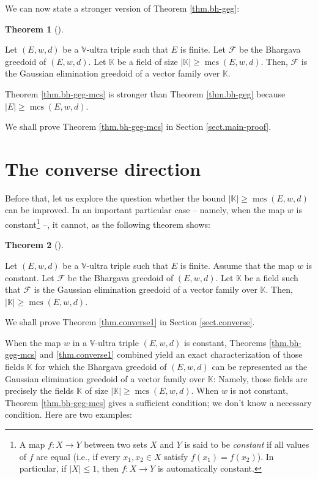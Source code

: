 \documentclass[numbers=enddot,12pt,final,onecolumn,notitlepage]{scrartcl}%
\theoremstyle{definition}
\newtheorem{theo}{Theorem}[section]
\newenvironment{theorem}[1][]
{\begin{theo}[#1]\begin{leftbar}}
{\end{leftbar}\end{theo}}
\renewcommand{\leq}{\leqslant}
\renewcommand{\geq}{\geqslant}
\theoremstyle{plainsl}
\begin{document}
We can now state a stronger version of Theorem \ref{thm.bh-geg}:

\begin{theorem}
\label{thm.bh-geg-mcs}Let $\left(  E,w,d\right)  $ be a $\mathbb{V}$-ultra
triple such that $E$ is finite. Let $\mathcal{F}$ be the Bhargava greedoid of
$\left(  E,w,d\right)  $. Let $\mathbb{K}$ be a field of size $\left\vert
\mathbb{K}\right\vert \geq\operatorname*{mcs}\left(  E,w,d\right)  $. Then,
$\mathcal{F}$ is the Gaussian elimination greedoid of a vector family over
$\mathbb{K}$.
\end{theorem}

Theorem \ref{thm.bh-geg-mcs} is stronger than Theorem \ref{thm.bh-geg} because
$\left\vert E\right\vert \geq\operatorname*{mcs}\left(  E,w,d\right)  $.

We shall prove Theorem \ref{thm.bh-geg-mcs} in Section \ref{sect.main-proof}.

\section{The converse direction}

Before that, let us explore the question whether the bound $\left\vert
\mathbb{K}\right\vert \geq\operatorname*{mcs}\left(  E,w,d\right)  $ can be
improved. In an important particular case -- namely, when the map $w$ is
constant\footnote{A map $f:X\rightarrow Y$ between two sets $X$ and $Y$ is
said to be \emph{constant} if all values of $f$ are equal (i.e., if every
$x_{1},x_{2}\in X$ satisfy $f\left(  x_{1}\right)  =f\left(  x_{2}\right)  $).
In particular, if $\left\vert X\right\vert \leq1$, then $f:X\rightarrow Y$ is
automatically constant.} --, it cannot, as the following theorem shows:

\begin{theorem}
\label{thm.converse1}Let $\left(  E,w,d\right)  $ be a $\mathbb{V}$-ultra
triple such that $E$ is finite. Assume that the map $w$ is constant. Let
$\mathcal{F}$ be the Bhargava greedoid of $\left(  E,w,d\right)  $. Let
$\mathbb{K}$ be a field such that $\mathcal{F}$ is the Gaussian elimination
greedoid of a vector family over $\mathbb{K}$. Then, $\left\vert
\mathbb{K}\right\vert \geq\operatorname*{mcs}\left(  E,w,d\right)  $.
\end{theorem}

We shall prove Theorem \ref{thm.converse1} in Section \ref{sect.converse}.

When the map $w$ in a $\mathbb{V}$-ultra triple $\left(  E,w,d\right)  $ is
constant, Theorems \ref{thm.bh-geg-mcs} and \ref{thm.converse1} combined yield
an exact characterization of those fields $\mathbb{K}$ for which the Bhargava
greedoid of $\left(  E,w,d\right)  $ can be represented as the Gaussian
elimination greedoid of a vector family over $\mathbb{K}$: Namely, those
fields are precisely the fields $\mathbb{K}$ of size $\left\vert
\mathbb{K}\right\vert \geq\operatorname*{mcs}\left(  E,w,d\right)  $. When $w$
is not constant, Theorem \ref{thm.bh-geg-mcs} gives a sufficient condition; we
don't know a necessary condition. Here are two examples:
\end{document}
